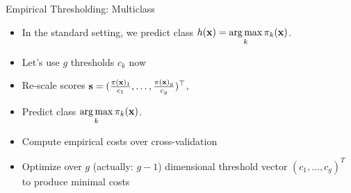 \documentclass[11pt,compress,t,notes=noshow, aspectratio=169, xcolor=table]{beamer}
\begin{document}
\begin{frame}{Empirical Thresholding: Multiclass}
    \begin{itemize}
        
        
            \item In the standard setting, we predict class $h(\mathbf{x}) = \mathop{\mathrm{arg\,max}}\limits_{k} \pi_{k}(\mathbf{x})$.
            
            \item Let's use $g$ thresholds $c_k$ now 
            
            \item Re-scale scores $ \mathbf{s} = (\frac{\pi(\mathbf{x})_1}{c_1},\ldots, \frac{\pi(\mathbf{x})_g}{ c_g})^\top$, 
            \item Predict class $\mathop{\mathrm{arg\,max}}\limits_k \pi_{k}(\mathbf{x}) $.

            \item Compute empirical costs over cross-validation

            \item Optimize over $g$ (actually: $g-1$) dimensional threshold vector $(c_1, \ldots, c_g)^T$ to produce minimal costs

    \end{itemize}
\end{frame}

%
%                   
%
\end{document}
